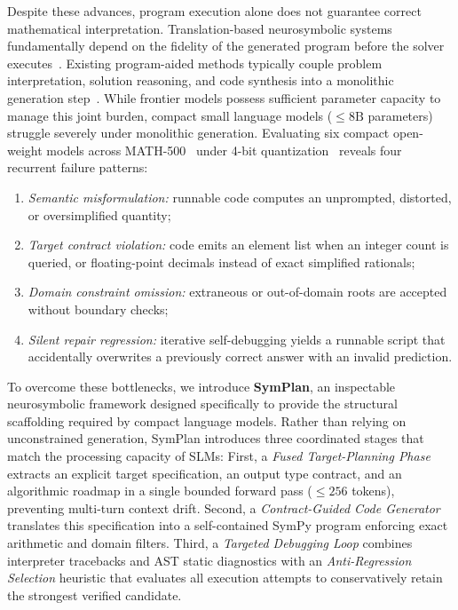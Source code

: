 \documentclass[conference,a4paper]{IEEEtran}
\begin{document}
Despite these advances, program execution alone does not guarantee correct mathematical interpretation. Translation-based neurosymbolic systems fundamentally depend on the fidelity of the generated program before the solver executes~\cite{lyu2023faithful,pan2023logiclm}. Existing program-aided methods typically couple problem interpretation, solution reasoning, and code synthesis into a monolithic generation step~\cite{gao2023pal,nezhad2025symcode}. While frontier models possess sufficient parameter capacity to manage this joint burden, compact small language models ($\le 8\text{B}$ parameters) struggle severely under monolithic generation. Evaluating six compact open-weight models across MATH-500~\cite{lightman2024verify,hendrycks2021math} under 4-bit quantization~\cite{dettmers2023qlora} reveals four recurrent failure patterns:
\begin{enumerate}
    \item \textit{Semantic misformulation:} runnable code computes an unprompted, distorted, or oversimplified quantity;
    \item \textit{Target contract violation:} code emits an element list when an integer count is queried, or floating-point decimals instead of exact simplified rationals;
    \item \textit{Domain constraint omission:} extraneous or out-of-domain roots are accepted without boundary checks;
    \item \textit{Silent repair regression:} iterative self-debugging yields a runnable script that accidentally overwrites a previously correct answer with an invalid prediction.
\end{enumerate}

To overcome these bottlenecks, we introduce \textbf{SymPlan}, an inspectable neurosymbolic framework designed specifically to provide the structural scaffolding required by compact language models. Rather than relying on unconstrained generation, SymPlan introduces three coordinated stages that match the processing capacity of SLMs:
First, a \textit{Fused Target-Planning Phase} extracts an explicit target specification, an output type contract, and an algorithmic roadmap in a single bounded forward pass ($\le 256$ tokens), preventing multi-turn context drift.
Second, a \textit{Contract-Guided Code Generator} translates this specification into a self-contained SymPy program enforcing exact arithmetic and domain filters.
Third, a \textit{Targeted Debugging Loop} combines interpreter tracebacks and AST static diagnostics with an \textit{Anti-Regression Selection} heuristic that evaluates all execution attempts to conservatively retain the strongest verified candidate.
\end{document}
